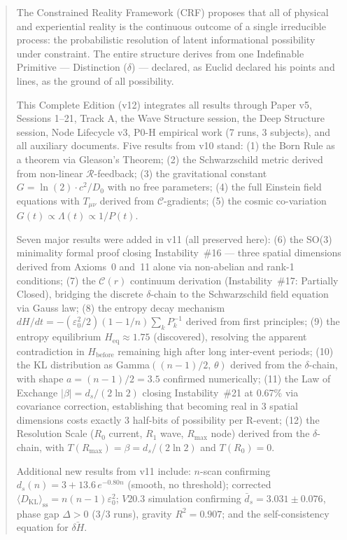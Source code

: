 \documentclass[12pt, a4paper]{article}
\begin{document}
\begin{abstract}
\sloppy
The Constrained Reality Framework (CRF) proposes that all of physical and experiential
reality is the continuous outcome of a single irreducible process: the probabilistic resolution
of latent informational possibility under constraint. The entire structure derives from one
Indefinable Primitive --- Distinction ($\delta$) --- declared, as Euclid declared his points
and lines, as the ground of all possibility.

This Complete Edition (v12) integrates all results through Paper v5, Sessions 1--21,
Track A, the Wave Structure session, the Deep Structure session, Node Lifecycle v3,
P0-H empirical work (7 runs, 3 subjects), and all auxiliary documents. Five results from v10 stand: (1) the Born Rule as a
theorem via Gleason's Theorem; (2) the Schwarzschild metric derived from non-linear
$\mathcal{R}$-feedback; (3) the gravitational constant $G = \ln(2)\cdot c^2/D_0$ with no
free parameters; (4) the full Einstein field equations with $T_{\mu\nu}$ derived from
$\mathcal{C}$-gradients; (5) the cosmic co-variation $G(t)\propto\Lambda(t)\propto 1/P(t)$.

Seven major results were added in v11 (all preserved here):
(6) the SO(3) minimality formal proof closing Instability~\#16 --- three spatial dimensions
derived from Axioms~0 and~11 alone via non-abelian and rank-1 conditions;
(7) the $\mathcal{C}(r)$ continuum derivation (Instability~\#17: Partially Closed),
bridging the discrete $\delta$-chain to the Schwarzschild field equation via Gauss law;
(8) the entropy decay mechanism $dH/dt = -(\varepsilon_0^2/2)(1-1/n)\sum_k P_k^{-1}$
derived from first principles;
(9) the entropy equilibrium $H_{\mathrm{eq}} \approx 1.75$ (discovered), resolving the
apparent contradiction in $H_{\mathrm{before}}$ remaining high after long inter-event periods;
(10) the KL distribution as Gamma$((n-1)/2,\,\theta)$ derived from the $\delta$-chain,
with shape $a = (n-1)/2 = 3.5$ confirmed numerically;
(11) the Law of Exchange $|\beta| = d_s/(2\ln 2)$ closing Instability~\#21 at 0.67\% via
covariance correction, establishing that becoming real in 3 spatial dimensions costs exactly
3 half-bits of possibility per R-event;
(12) the Resolution Scale ($R_0$ current, $R_1$ wave, $R_{\max}$ node) derived from the
$\delta$-chain, with $T(R_{\max}) = \beta = d_s/(2\ln 2)$ and $T(R_0) = 0$.

Additional new results from v11 include: $n$-scan confirming $d_s(n) = 3 + 13.6\,e^{-0.80n}$
(smooth, no threshold); corrected $\langle D_{\mathrm{KL}}\rangle_{\mathrm{ss}} = n(n-1)\varepsilon_0^2$;
$V20.3$ simulation confirming $\bar{d}_s = 3.031\pm 0.076$, phase gap $\Delta > 0$ (3/3 runs),
gravity $R^2 = 0.907$; and the self-consistency equation for $\bar{\delta H}$.


\end{abstract}
\end{document}
